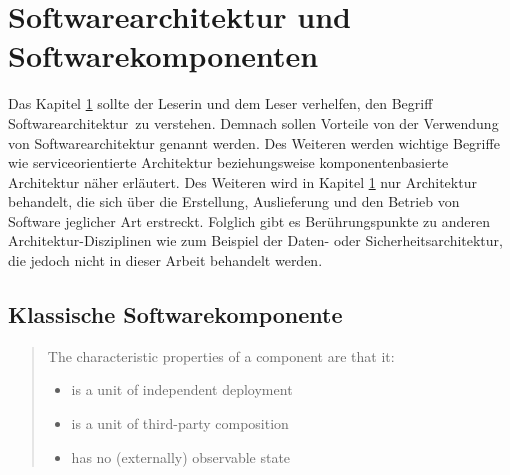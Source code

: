 \section{Softwarearchitektur und Softwarekomponenten}
\label{sec:2_Architektur}
Das Kapitel \ref{sec:2_Architektur} sollte der Leserin und dem Leser verhelfen, den Begriff \glqq Softwarearchitektur\grqq\ zu verstehen. Demnach sollen Vorteile von der Verwendung von Softwarearchitektur genannt werden. Des Weiteren werden wichtige Begriffe wie serviceorientierte Architektur beziehungsweise komponentenbasierte Architektur näher erläutert.
Des Weiteren wird in Kapitel \ref{sec:2_Architektur} nur Architektur behandelt, die sich über die Erstellung, Auslieferung und den Betrieb von Software jeglicher Art erstreckt. Folglich gibt es Berührungspunkte zu anderen Architektur-Disziplinen wie zum Beispiel der Daten- oder Sicherheitsarchitektur, die jedoch nicht in dieser Arbeit behandelt werden.

\subsection{Klassische Softwarekomponente}
\label{sec:2_Softwarekomponente_Klassisch}
\begin{quote}
\glqq The characteristic properties of a component are that it:
\begin{itemize}
\item is a unit of independent deployment
\item is a unit of third-party composition
\item has no (externally) observable state\grqq
\end{itemize}
\end{quote}

